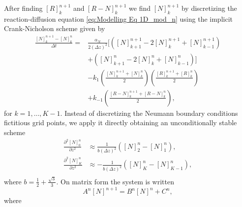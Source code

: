 \documentclass{article}
\begin{document}
After finding $[R]_k^{n+1}$ and $[R-N]_{k}^{n+1}$ we find $[N]_{k}^{n+1}$ by discretizing the reaction-diffusion equation \eqref{eq:Modelling Eq 1D_mod_n} using the implicit Crank-Nicholson scheme given by 
\begin{align}\label{eq:cn_1D}
        \frac{[N]_{k}^{n+1} - [N]_{k}^{n}}{\Delta t} =& \frac{\alpha_N}{2 (\Delta z)^2} [ \left( [N]_{k+1}^{n+1} - 2[N]_{k}^{n+1} + [N]_{k-1}^{n+1} \right) \\
                                                     & +\left( [N]_{k+1}^{n} - 2 [N]_{k}^{n}+ [N]_{k-1}^{n} \right) ] \\
                                                     &- k_1 \left( \frac{[N]_{k}^{n+1} + [N]_k^n}{2} \right) \left( \frac{[R]_{k}^{n+1} + [R]_k^n}{2} \right) \\
                                                     &+k_{-1}\left( \frac{[R-N]_{k}^{n+1} + [R-N]_k^n}{2} \right),
\end{align}
for $k = 1, \hdots, K - 1$.
Instead of discretizing the Neumann boundary conditions fictitious grid points, we apply it directly obtaining an unconditionally stable scheme \cite{khaliq}
\begin{align*}
        \frac{\partial^2 [N]_0^{n}}{\partial z^2} &\approx \frac{1}{b (\Delta z)^2}([N]_2^n - [N]_1^n), \\
        \frac{\partial^2 [N]_K^{n}}{\partial z^2} &\approx -\frac{1}{b (\Delta z)^2}([N]_K^n - [N]_{K-1}^n), \\
\end{align*}
where $b = \frac{1}{2} + \frac{\sqrt{3}}{3}$.
On matrix form the system is written
\begin{equation}\label{eq:system}
        A^n[N]^{n+1} = B^n[N]^n + C^n,
\end{equation}
where
\end{document}
